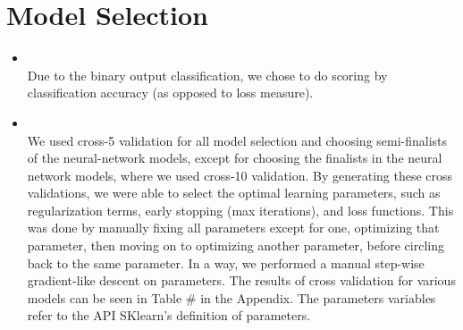 \section{Model Selection}
\medskip
\begin{itemize}

    \item {} \\
    Due to the binary output classification, we chose to do scoring by classification accuracy (as opposed to loss measure). 

    \item {} \\
    We used cross-5 validation for all model selection and choosing semi-finalists of the neural-network models, except for choosing the finalists in the neural network models, where we used cross-10 validation.  By generating these cross validations, we were able to select the optimal learning parameters, such as regularization terms, early stopping (max iterations), and loss functions. This was done by manually fixing all parameters except for one, optimizing that parameter, then moving on to optimizing another parameter, before circling back to the same parameter. In a way, we performed a manual step-wise gradient-like descent on parameters. The results of cross validation for various models can be seen in Table \# in the Appendix. The parameters variables refer to the API SKlearn's definition of parameters.

\end{itemize}



